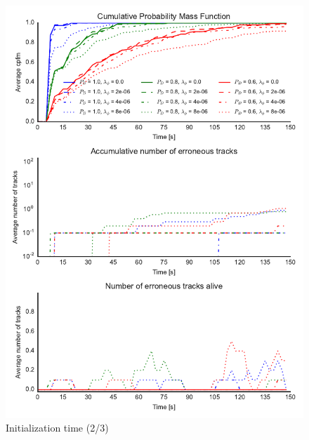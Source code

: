 \begin{figure}
\centering
\includegraphics{Figures/plots/Scenario1_Init-Time(2-3).pdf}
\caption{Initialization time (2/3)}\label{fig:init_time_2-3}
\end{figure}

